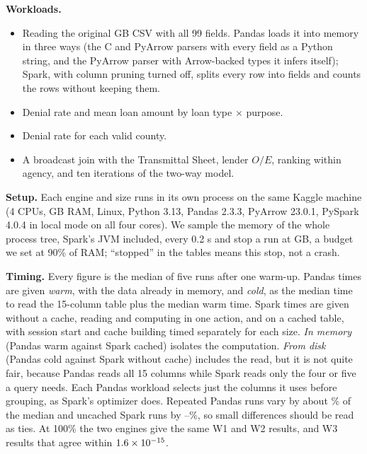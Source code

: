 \documentclass[acmtog,nonacm]{acmart}
\begin{document}
\textbf{Workloads.}
\begin{itemize}[leftmargin=2.2em,itemsep=0pt,topsep=2pt,parsep=0pt]
\item[(W0)] Reading the original \wzCsvGb{} GB CSV with all 99 fields. Pandas loads it into memory in three ways (the C and PyArrow parsers with every field as a Python string, and the PyArrow parser with Arrow-backed types it infers itself); Spark, with column pruning turned off, splits every row into fields and counts the rows without keeping them.
\item[(W1)] Denial rate and mean loan amount by loan type $\times$ purpose.
\item[(W2)] Denial rate for each valid county.
\item[(W3)] A broadcast join with the Transmittal Sheet, lender $O/E$, ranking within agency, and ten iterations of the two-way model.
\end{itemize}
\textbf{Setup.} Each engine and size runs in its own process on the same Kaggle machine (4 CPUs, \ramTotal{} GB RAM, Linux, Python 3.13, Pandas 2.3.3, PyArrow 23.0.1, PySpark 4.0.4 in local mode on all four cores). We sample the memory of the whole process tree, Spark's JVM included, every 0.2 s and stop a run at \budget{} GB, a budget we set at 90\% of RAM; ``stopped'' in the tables means this stop, not a crash.

\textbf{Timing.} Every figure is the median of five runs after one warm-up. Pandas times are given \emph{warm}, with the data already in memory, and \emph{cold}, as the median time to read the 15-column table plus the median warm time. Spark times are given without a cache, reading and computing in one action, and on a cached table, with session start and cache building timed separately for each size. \emph{In memory} (Pandas warm against Spark cached) isolates the computation. \emph{From disk} (Pandas cold against Spark without cache) includes the read, but it is not quite fair, because Pandas reads all 15 columns while Spark reads only the four or five a query needs. Each Pandas workload selects just the columns it uses before grouping, as Spark's optimizer does. Repeated Pandas runs vary by about \spreadPandas\% of the median and uncached Spark runs by \spreadSparkLo--\spreadSparkHi\%, so small differences should be read as ties. At 100\% the two engines give the same W1 and W2 results, and W3 results that agree within $1.6\times10^{-15}$.
\end{document}
